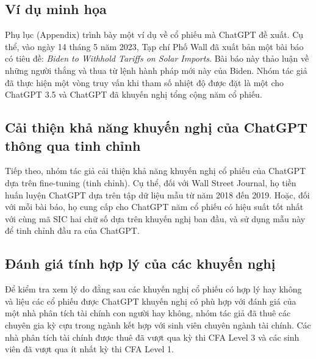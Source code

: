 \documentclass[a4paper,12pt]{article}
\begin{document}
\subsection{Ví dụ minh họa}
Phụ lục (Appendix) trình bày một ví dụ về cổ phiếu mà ChatGPT đề xuất. Cụ thể, vào ngày 14 tháng 5 năm 2023, Tạp chí Phố Wall đã xuất bản một bài báo có tiêu đề: \textit{Biden to Withhold Tariffs on Solar Imports}. Bài báo này thảo luận về những người thắng và thua từ lệnh hành pháp mới này của Biden. Nhóm tác giả đã thực hiện một vòng truy vấn khi tham số nhiệt độ được đặt là một cho ChatGPT 3.5 và ChatGPT đã khuyến nghị tổng cộng năm cổ phiếu.

\subsection{Cải thiện khả năng khuyến nghị của ChatGPT thông qua tinh chỉnh}
Tiếp theo, nhóm tác giả cải thiện khả năng khuyến nghị cổ phiếu của ChatGPT dựa trên fine-tuning (tinh chỉnh). Cụ thể, đối với Wall Street Journal, họ tiền huấn luyện ChatGPT dựa trên tập dữ liệu mẫu từ năm 2018 đến 2019. Hoặc, đối với mỗi bài báo, họ cung cấp cho ChatGPT năm cổ phiếu có hiệu suất tốt nhất với cùng mã SIC hai chữ số dựa trên khuyến nghị ban đầu, và sử dụng mẫu này để tinh chỉnh đầu ra của ChatGPT.


\subsection{Đánh giá tính hợp lý của các khuyến nghị}
Để kiểm tra xem lý do đằng sau các khuyến nghị cổ phiếu có hợp lý hay không và liệu các cổ phiếu được ChatGPT khuyến nghị có phù hợp với đánh giá của một nhà phân tích tài chính con người hay không, nhóm tác giả đã thuê các chuyên gia kỳ cựu trong ngành kết hợp với sinh viên chuyên ngành tài chính. Các nhà phân tích tài chính được thuê đã vượt qua kỳ thi CFA Level 3 và các sinh viên đã vượt qua ít nhất kỳ thi CFA Level 1.
\end{document}
